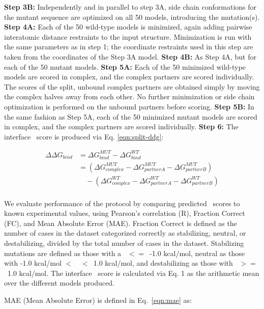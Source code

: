 \textbf{Step 3B:} Independently and in parallel to step 3A, side chain conformations for the mutant sequence are optimized on all 50 models, introducing the mutation(s).
\textbf{Step 4A:} Each of the 50 wild-type models is minimized, again adding pairwise interatomic distance restraints to the input structure. Minimization is run with the same parameters as in step 1; the coordinate restraints used in this step are taken from the coordinates of the Step 3A model.
\textbf{Step 4B:} As Step 4A, but for each of the 50 mutant models.
\textbf{Step 5A:} Each of the 50 minimized wild-type models are scored in complex, and the complex partners are scored individually. The scores of the split, unbound complex partners are obtained simply by moving the complex halves away from each other. No further minimization or side chain optimization is performed on the unbound partners before scoring.
\textbf{Step 5B:} In the same fashion as Step 5A, each of the 50 minimized mutant models are scored in complex, and the complex partners are scored individually.
\textbf{Step 6:} The interface \ddg\ score is produced via Eq. \ref{eqn:split-ddg}:

\begin{equation}\label{eqn:split-ddg}
  \begin{split}
    {\Delta\Delta}G_{bind} & ={\Delta}G^{MUT}_{bind} - {\Delta}G^{WT}_{bind}\\
    & =({\Delta}G^{MUT}_{complex} - {\Delta}G^{MUT}_{partner A} - {\Delta}G^{MUT}_{partner B})\\
    & \quad - ({\Delta}G^{WT}_{complex} - {\Delta}G^{WT}_{partner A} - {\Delta}G^{WT}_{partner B})\\
  \end{split}
\end{equation}

We evaluate performance of the protocol by comparing predicted \ddg\ scores to known experimental values, using Pearson's correlation (R), Fraction Correct (FC), and Mean Absolute Error (MAE). Fraction Correct is defined as the number of cases in the dataset categorized correctly as stabilizing, neutral, or destabilizing, divided by the total number of cases in the dataset. Stabilizing mutations are defined as those with a \ddg\ $<=$\ -1.0 kcal/mol, neutral as those with -1.0 kcal/mol $<$\ \ddg\ $<$\ 1.0 kcal/mol, and destabilizing as those with \ddg\ $>=$\ 1.0 kcal/mol. The interface \ddg\ score is calculated via Eq. 1 as the arithmetic mean over the different models produced.

MAE (Mean Absolute Error) is defined in Eq.~\ref{eqn:mae} as:

